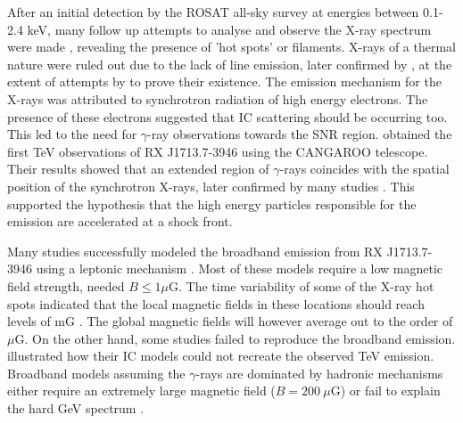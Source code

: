 \documentclass[12pt,a4paper]{article}
\begin{document}
After an initial detection by the ROSAT all-sky survey at energies between 0.1-2.4 keV, many follow up attempts to analyse and observe the X-ray spectrum were made \citep{1997PASJ...49L...7K,2003A&A...400..567U}, revealing the presence of 'hot spots' or filaments. X-rays of a thermal nature were ruled out due to the lack of line emission, later confirmed by \cite{1999ApJ...525..357S,2003A&A...400..567U}, at the extent of attempts by \cite{2005A&A...431..953H} to prove their existence. The emission mechanism for the X-rays was attributed to synchrotron radiation of high energy electrons. The presence of these electrons suggested that IC scattering should be occurring too. This led to the need for $\gamma$-ray observations towards the SNR region. \cite{2000A&A...354L..57M} obtained the first TeV observations of RX J1713.7-3946 using the CANGAROO telescope. Their results showed that an extended region of $\gamma$-rays coincides with the spatial position of the synchrotron X-rays, later confirmed by many studies \cite{2006A&A...449..223A,2007A&A...464..235A,2008ApJ...685..988T,2009A&A...505..157A}. This supported the hypothesis that the high energy particles responsible for the emission are accelerated at a shock front. 

Many studies successfully modeled the broadband emission from RX J1713.7-3946 using a leptonic mechanism \citep{2001ApJ...563..191E,2004ApJ...602..271L}. Most of these models require a low magnetic field strength, \cite{2004ApJ...602..271L} needed $B \leq 1 \mu$G. The time variability of some of the X-ray hot spots indicated that the local magnetic fields in these locations should reach levels of mG \cite{2007Natur.449..576U}. The global magnetic fields will however average out to the order of $\mu$G.
On the other hand, some studies failed to reproduce the broadband emission.  \cite{2003A&A...400..567U,2006A&A...449..223A} illustrated how their IC models could not recreate the observed TeV emission.
Broadband models assuming the $\gamma$-rays are dominated by hadronic mechanisms either require an extremely large magnetic field \citep{2008ApJ...685..988T}($B = 200 \ \mu$G) or fail to explain the hard GeV spectrum \cite{2011ApJ...734...28A}.
\end{document}
